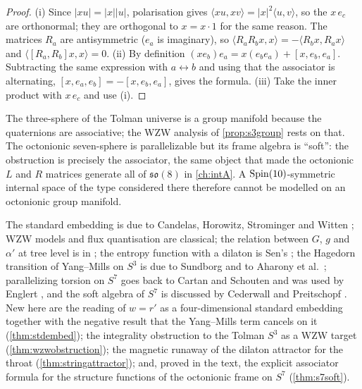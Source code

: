 \begin{proof}
(i) Since $|xu|=|x||u|$, polarisation gives $\langle xu,xv\rangle=|x|^2\langle u,v\rangle$, so the $x\,e_c$ are orthonormal; they are orthogonal to $x=x\cdot1$ for the same reason. The matrices $R_a$ are antisymmetric ($e_a$ is imaginary), so $\langle R_aR_bx,x\rangle=-\langle R_bx,R_ax\rangle$ and $\langle[R_a,R_b]x,x\rangle=0$. (ii) By definition $(xe_b)e_a=x(e_be_a)+[x,e_b,e_a]$. Subtracting the same expression with $a\leftrightarrow b$ and using that the associator is alternating, $[x,e_a,e_b]=-[x,e_b,e_a]$, gives the formula. (iii) Take the inner product with $x\,e_c$ and use (i).
\end{proof}


The three-sphere of the Tolman universe is a group manifold because the quaternions are associative; the WZW analysis of \cref{prop:s3group} rests on that. The octonionic seven-sphere is parallelizable but its frame algebra is ``soft'': the obstruction is precisely the associator, the same object that made the octonionic $L$ and $R$ matrices generate all of $\mathfrak{so}(8)$ in \cref{ch:intA}. A $\mathrm{Spin}(10)$-symmetric internal space of the type considered there therefore cannot be modelled on an octonionic group manifold.

\begin{litbox}
The standard embedding is due to Candelas, Horowitz, Strominger and Witten \cite{CHSW1985}; WZW models and flux quantisation are classical; the relation between $G$, $g$ and $\alpha'$ at tree level is in \cite{Kaplunovsky1988,Witten1996}; the entropy function with a dilaton is Sen's \cite{Sen2005}; the Hagedorn transition of Yang--Mills on $S^3$ is due to Sundborg and to Aharony et al.\ \cite{Sundborg2000,AMMPV2004}; parallelizing torsion on $S^7$ goes back to Cartan and Schouten and was used by Englert \cite{Englert1982}, and the soft algebra of $S^7$ is discussed by Cederwall and Preitschopf \cite{CederwallPreitschopf1995}. New here are the reading of $w=r'$ as a four-dimensional standard embedding together with the negative result that the Yang--Mills term cancels on it (\cref{thm:stdembed}); the integrality obstruction to the Tolman $S^3$ as a WZW target (\cref{thm:wzwobstruction}); the magnetic runaway of the dilaton attractor for the throat (\cref{thm:stringattractor}); and, proved in the text, the explicit associator formula for the structure functions of the octonionic frame on $S^7$ (\cref{thm:s7soft}).
\end{litbox}

